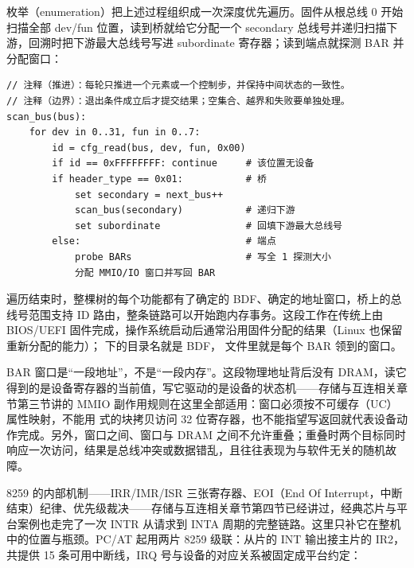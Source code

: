 枚举（enumeration）把上述过程组织成一次深度优先遍历。固件从根总线 0 开始扫描全部 dev/fun 位置，读到桥就给它分配一个 secondary 总线号并递归扫描下游，回溯时把下游最大总线号写进 subordinate 寄存器；读到端点就探测 BAR 并分配窗口：

\begin{lstlisting}
// 注释（推进）：每轮只推进一个元素或一个控制步，并保持中间状态的一致性。
// 注释（边界）：退出条件成立后才提交结果；空集合、越界和失败要单独处理。
scan_bus(bus):
    for dev in 0..31, fun in 0..7:
        id = cfg_read(bus, dev, fun, 0x00)
        if id == 0xFFFFFFFF: continue     # 该位置无设备
        if header_type == 0x01:           # 桥
            set secondary = next_bus++
            scan_bus(secondary)           # 递归下游
            set subordinate               # 回填下游最大总线号
        else:                             # 端点
            probe BARs                    # 写全 1 探测大小
            分配 MMIO/IO 窗口并写回 BAR
\end{lstlisting}

遍历结束时，整棵树的每个功能都有了确定的 BDF、确定的地址窗口，桥上的总线号范围支持 ID 路由，整条链路可以开始跑内存事务。这段工作在传统上由 BIOS/UEFI 固件完成，操作系统启动后通常沿用固件分配的结果（Linux 也保留重新分配的能力）； 下的目录名就是 BDF， 文件里就是每个 BAR 领到的窗口。

\begin{warningbox}
BAR 窗口是“一段地址”，不是“一段内存”。这段物理地址背后没有 DRAM，读它得到的是设备寄存器的当前值，写它驱动的是设备的状态机——存储与互连相关章节第三节讲的 MMIO 副作用规则在这里全部适用：窗口必须按不可缓存（UC）属性映射，不能用  式的块拷贝访问 32 位寄存器，也不能指望写返回就代表设备动作完成。另外，窗口之间、窗口与 DRAM 之间不允许重叠；重叠时两个目标同时响应一次访问，结果是总线冲突或数据错乱，且往往表现为与软件无关的随机故障。
\end{warningbox}


8259 的内部机制——IRR/IMR/ISR 三张寄存器、EOI（End Of Interrupt，中断结束）纪律、优先级裁决——存储与互连相关章节第四节已经讲过，经典芯片与平台案例也走完了一次 INTR 从请求到 INTA 周期的完整链路。这里只补它在整机中的位置与瓶颈。PC/AT 起用两片 8259 级联：从片的 INT 输出接主片的 IR2，共提供 15 条可用中断线，IRQ 号与设备的对应关系被固定成平台约定：


